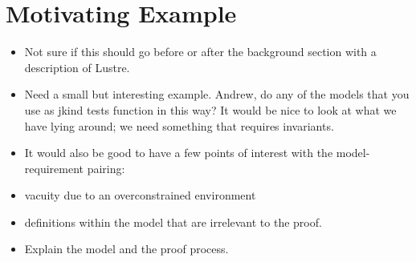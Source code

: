 \section{Motivating Example}
\label{sec:exmpl}

\begin{itemize}
    \item Not sure if this should go before or after the background section with a description of Lustre.
    \item Need a small but interesting example.  Andrew, do any of the models that you use as jkind tests
        function in this way?  It would be nice to look at what we have lying around; we need something 
        that requires invariants.
    \item It would also be good to have a few points of interest with the model-requirement pairing: 
    \item \quad   vacuity due to an overconstrained environment 
    \item \quad   definitions within the model that are irrelevant to the proof.
    \item Explain the model and the proof process.
\end{itemize}
